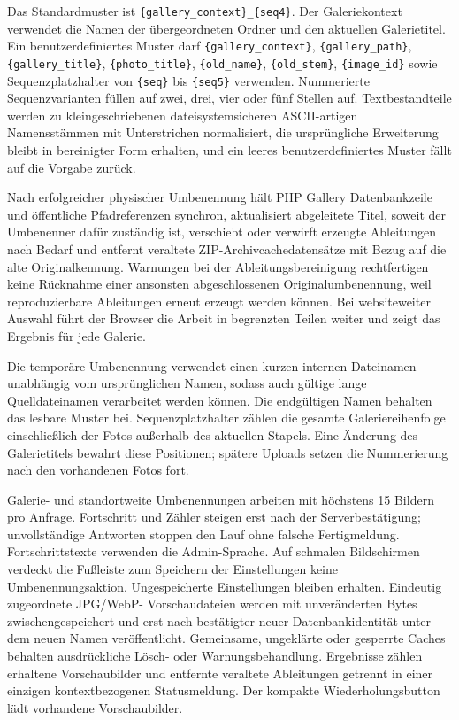\documentclass[11pt,a4paper]{article}
\newcommand{\codeword}[1]{\nolinkurl{#1}}
\begin{document}
Das Standardmuster ist \codeword{\{gallery_context\}_\{seq4\}}. Der
Galeriekontext verwendet die Namen der übergeordneten Ordner und den aktuellen
Galerietitel. Ein benutzerdefiniertes Muster darf
\codeword{\{gallery_context\}}, \codeword{\{gallery_path\}},
\codeword{\{gallery_title\}}, \codeword{\{photo_title\}},
\codeword{\{old_name\}}, \codeword{\{old_stem\}}, \codeword{\{image_id\}} sowie
Sequenzplatzhalter von \codeword{\{seq\}} bis \codeword{\{seq5\}} verwenden.
Nummerierte Sequenzvarianten füllen auf zwei, drei, vier oder fünf Stellen auf.
Textbestandteile werden zu kleingeschriebenen dateisystemsicheren ASCII-artigen
Namensstämmen mit Unterstrichen normalisiert, die ursprüngliche Erweiterung
bleibt in bereinigter Form erhalten, und ein leeres benutzerdefiniertes Muster
fällt auf die Vorgabe zurück.

Nach erfolgreicher physischer Umbenennung hält PHP Gallery Datenbankzeile und
öffentliche Pfadreferenzen synchron, aktualisiert abgeleitete Titel, soweit der
Umbenenner dafür zuständig ist, verschiebt oder verwirft erzeugte Ableitungen
nach Bedarf und entfernt veraltete ZIP-Archivcachedatensätze mit Bezug auf die
alte Originalkennung. Warnungen bei der Ableitungsbereinigung rechtfertigen
keine Rücknahme einer ansonsten abgeschlossenen Originalumbenennung, weil
reproduzierbare Ableitungen erneut erzeugt werden können. Bei websiteweiter
Auswahl führt der Browser die Arbeit in begrenzten Teilen weiter und zeigt das
Ergebnis für jede Galerie.

Die temporäre Umbenennung verwendet einen kurzen internen Dateinamen unabhängig
vom ursprünglichen Namen, sodass auch gültige lange Quelldateinamen verarbeitet
werden können. Die endgültigen Namen behalten das lesbare Muster bei.
Sequenzplatzhalter zählen die gesamte Galeriereihenfolge einschließlich der
Fotos außerhalb des aktuellen Stapels. Eine Änderung des Galerietitels bewahrt
diese Positionen; spätere Uploads setzen die Nummerierung nach den vorhandenen
Fotos fort.

Galerie- und standortweite Umbenennungen arbeiten mit höchstens 15 Bildern
pro Anfrage. Fortschritt und Zähler steigen erst nach der Serverbestätigung;
unvollständige Antworten stoppen den Lauf ohne falsche Fertigmeldung.
Fortschrittstexte verwenden die Admin-Sprache. Auf schmalen Bildschirmen
verdeckt die Fußleiste zum Speichern der Einstellungen keine Umbenennungsaktion.
Ungespeicherte Einstellungen bleiben erhalten. Eindeutig zugeordnete JPG/WebP-
Vorschaudateien werden mit unveränderten Bytes zwischengespeichert und erst
nach bestätigter neuer Datenbankidentität unter dem neuen Namen veröffentlicht.
Gemeinsame, ungeklärte oder gesperrte Caches behalten ausdrückliche Lösch- oder
Warnungsbehandlung. Ergebnisse zählen erhaltene Vorschaubilder und entfernte
veraltete Ableitungen getrennt in einer einzigen kontextbezogenen Statusmeldung.
Der kompakte Wiederholungsbutton lädt vorhandene
Vorschaubilder.
\end{document}
